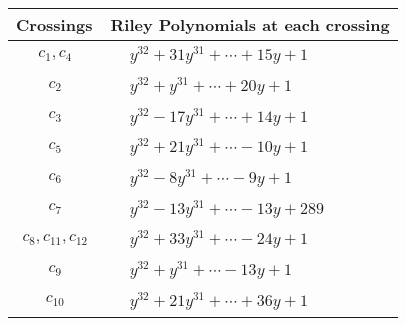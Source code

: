 \documentclass[1p]{elsarticle_modified}
\theoremstyle{definition}
\begin{document}
\begin{tabular}{m{50pt}|m{274pt}}
Crossings & \hspace{64pt}Riley Polynomials at each crossing \\
\hline $$\begin{aligned}c_{1},c_{4}\end{aligned}$$&$\begin{aligned}
&y^{32}+31 y^{31}+\cdots+15 y+1
\end{aligned}$\\
\hline $$\begin{aligned}c_{2}\end{aligned}$$&$\begin{aligned}
&y^{32}+y^{31}+\cdots+20 y+1
\end{aligned}$\\
\hline $$\begin{aligned}c_{3}\end{aligned}$$&$\begin{aligned}
&y^{32}-17 y^{31}+\cdots+14 y+1
\end{aligned}$\\
\hline $$\begin{aligned}c_{5}\end{aligned}$$&$\begin{aligned}
&y^{32}+21 y^{31}+\cdots-10 y+1
\end{aligned}$\\
\hline $$\begin{aligned}c_{6}\end{aligned}$$&$\begin{aligned}
&y^{32}-8 y^{31}+\cdots-9 y+1
\end{aligned}$\\
\hline $$\begin{aligned}c_{7}\end{aligned}$$&$\begin{aligned}
&y^{32}-13 y^{31}+\cdots-13 y+289
\end{aligned}$\\
\hline $$\begin{aligned}c_{8},c_{11},c_{12}\end{aligned}$$&$\begin{aligned}
&y^{32}+33 y^{31}+\cdots-24 y+1
\end{aligned}$\\
\hline $$\begin{aligned}c_{9}\end{aligned}$$&$\begin{aligned}
&y^{32}+y^{31}+\cdots-13 y+1
\end{aligned}$\\
\hline $$\begin{aligned}c_{10}\end{aligned}$$&$\begin{aligned}
&y^{32}+21 y^{31}+\cdots+36 y+1
\end{aligned}$\\
\hline
\end{tabular}\\~\\
\end{document}
